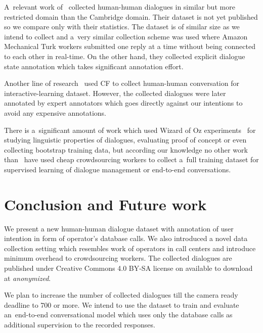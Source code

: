 \documentclass[runningheads,a4paper]{llncs}
\def\OD#1{{\color{darkgreen}OD: \it #1}}
\begin{document}
A~relevant work of~\cite{wen2016network} collected human-human dialogues in similar but more restricted domain than the Cambridge domain.
Their dataset is not yet published so we compare only with their statistics.
The dataset is of similar size as we intend to collect and a~very similar collection scheme was used where Amazon Mechanical Turk workers submitted one reply at a time without being connected to each other in real-time.
On the other hand, they collected explicit dialogue state annotation which takes significant annotation effort.

Another line of research~\cite{vodolan2016data} used CF to collect human-human conversation for interactive-learning dataset.
However, the collected dialogues were later annotated by expert annotators which goes directly against our intentions to avoid any expensive annotations.

There is a~significant amount of work which used Wizard of Oz experiments~\cite{whittaker2002fish,walker1997evaluating,rieser2008learning} for studying linguistic properties of dialogues, evaluating proof of concept or even collecting bootstrap training data, but according our knowledge no other work than~\cite{wen2016network} have used cheap crowdsourcing workers to collect a~full training dataset for supervised learning of dialogue management or end-to-end conversations.

\section{Conclusion and Future work} \label{sec:conc}
\vspace{-0.50em}
We present a new human-human dialogue dataset with annotation of user intention in form of operator's database calls.
We also introduced a novel data collection setting which resembles work of operators in call centers and introduce minimum overhead to crowdsourcing workers.
The collected dialogues are published under Creative Commons 4.0 BY-SA license on available to download at {\it anonymized}.  %

We plan to increase the number of collected dialogues till the camera ready deadline to 700 or more.
We intend to use the dataset to train and evaluate an~end-to-end conversational model which uses only the database calls as additional supervision to the recorded responses. 
\end{document}

